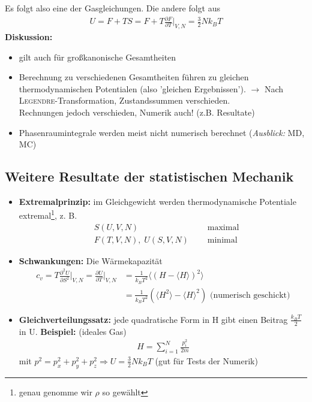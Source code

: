 \documentclass[12pt]{article}
\begin{document}
Es folgt also eine der Gasgleichungen. Die andere folgt aus
\begin{align}
U = F + TS = F + T \frac{\partial F}{\partial T} \biggr\vert_{V,N} = \frac{3}{2} N k_B T
\end{align}
\textbf{Diskussion:} \\
\begin{itemize}
\item gilt auch für großkanonische Gesamtheiten
\item Berechnung zu verschiedenen Gesamtheiten führen zu gleichen thermodynamischen Potentialen (also 'gleichen Ergebnissen'). $\to$ Nach \textsc{Legendre}-Transformation, Zustandssummen verschieden. \\
Rechnungen jedoch verschieden, Numerik auch! (z.B. Resultate) %
\item Phasenraumintegrale werden meist nicht numerisch berechnet %
(\textit{Ausblick:} MD, MC) 
\end{itemize}
\subsection{Weitere Resultate der statistischen Mechanik}
\begin{itemize}
\item \textbf{Extremalprinzip:} im Gleichgewicht werden thermodynamische Potentiale extremal\footnote{genau genomme wir $\rho$ so gewählt}, z. B. 
\begin{align}
& S(U,V,N) \, && \mbox{ maximal} \\
& F(T,V,N), \; U(S,V,N) \; && \mbox{ minimal}
\end{align}
\item \textbf{Schwankungen:} Die Wärmekapazität
\begin{align}
c_v = T \frac{\partial ^2 U}{\partial S ^2} \biggr\vert_{V,N} = \frac{\partial U}{\partial T}  \biggr\vert_{V,N} &= \frac{1}{k_B T^2} \langle (H - \langle H \rangle)^2\rangle \\
&= \frac{1}{k_B T^2} \left( \langle H^2 \rangle - \langle H \rangle ^2 \right) \mbox{ (numerisch geschickt)}
\end{align}
\item \textbf{Gleichverteilungssatz:} jede quadratische Form in H gibt einen Beitrag $\frac{k_B T}{2}$ in U. 
\textbf{Beispiel:} (ideales Gas) 
\begin{align*}
H = \sum_{i=1}^N \frac{p_i ^2}{2m}
\end{align*}
mit $p^2 = p_x^2 + p_y^2 + p_z^2 \Rightarrow U= \frac{3}{2} N k_B T$ (gut für Tests der Numerik) 
\end{itemize}
\end{document}
